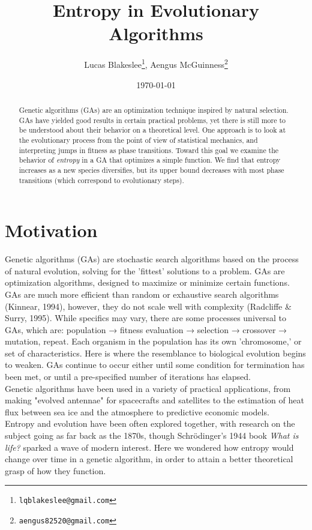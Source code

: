 \documentclass[11pt]{article}
\date{\today}
\title{Entropy in Evolutionary Algorithms}
\author{Lucas Blakeslee\footnote{\texttt{lqblakeslee@gmail.com}},
  Aengus McGuinness\footnote{\texttt{aengus82520@gmail.com}}}
\begin{document}
\maketitle


\label{sec:org26f53e0}
\begin{abstract}
\label{sec:orga17da23}
Genetic algorithms (GAs) are an optimization technique inspired by
natural selection. GAs have yielded good results in certain practical
problems, yet there is still more to be understood about their
behavior on a theoretical level. One approach is to look at the
evolutionary process from the point of view of statistical mechanics,
and interpreting jumps in fitness as phase transitions. Toward this
goal we examine the behavior of \emph{entropy} in a GA that optimizes
a simple function.  We find that entropy increases as a new species
diversifies, but its upper bound decreases with most phase
transitions (which correspond to evolutionary steps).
\end{abstract}




\section{Motivation}
\label{sec:org16abecd}
Genetic algorithms (GAs) are stochastic search algorithms based on the
process of natural evolution, solving for the 'fittest' solutions to a
problem. GAs are optimization algorithms, designed to maximize or
minimize certain functions. GAs are much more efficient than random or
exhaustive search algorithms (Kinnear, 1994), however, they do not
scale well with complexity (Radcliffe \& Surry, 1995). While specifics
may vary, there are some processes universal to GAs, which are:
population → fitness evaluation → selection → crossover → mutation,
repeat. Each organism in the population has its own 'chromosome,' or
set of characteristics. Here is where the resemblance to biological
evolution begins to weaken. GAs continue to occur either
until some condition for termination has been met, or until a
pre-specified number of iterations has elapsed. \\
Genetic algorithms
have been used in a variety of practical applications, from making
"evolved antennae" for spacecrafts and satellites to the estimation of
heat flux between sea ice and the atmosphere to predictive economic
models. \\
Entropy and evolution have been often explored together, with
research on the subject going as far back as the 1870s, though
Schrödinger's 1944 book \emph{What is life?} sparked a wave of modern
interest. Here we wondered how entropy would change over time in a
genetic algorithm, in order to attain a better theoretical grasp of
how they function.
\end{document}
